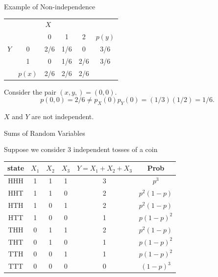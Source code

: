 \documentclass{beamer}\usepackage[]{graphicx}\usepackage[]{color}
\begin{document}
\begin{frame}[fragile]{Example of Non-independence  \;\;}

\begin{center}
\begin{tabular}{l|c||c|c|c||c|}
\multicolumn{5}{c}{$X$}\\
\cline{2-6}
&&0&1&2&$p(y)$\\
\cline{2-6}
$Y$&0&2/6& 1/6&0&3/6\\
\cline{2-6}
   &1&0&1/6&2/6&3/6\\
\cline{2-6}
   &$p(x)$ &2/6&2/6&2/6&\\
\cline{2-6}
\end{tabular}
\end{center}

Consider the pair $(x,y,) = (0,0).$
$$p(0,0) = 2/6 \ne p_X(0)p_Y(0) = (1/3)(1/2) = 1/6.$$

$X$ and $Y$ are not independent.

\end{frame}


\begin{frame}{Sums of Random Variables}

Suppose we consider 3 independent tosses of a coin 

\begin{tabular}{|c|c|c|c|c|c|}
\hline
state & $X_1$ & $X_2$ & $X_3$ & $Y=X_1 + X_2 + X_3$ & Prob\\ \hline
HHH & 1 & 1 & 1 & 3 & $p^3$ \\ \hline
HHT & 1 & 1 & 0 & 2 & $p^2 (1-p) $ \\ \hline
HTH & 1 & 0 & 1 & 2 & $p^2 (1-p) $ \\ \hline
HTT & 1 & 0 & 0 & 1 & $p (1-p)^2 $ \\ \hline
THH & 0 & 1 & 1 & 2 & $p^2 (1-p) $\\ \hline
THT & 0 & 1 & 0 & 1 & $ p (1-p)^2 $ \\ \hline
TTH & 0 & 0 & 1 & 1 & $ p (1-p)^2 $ \\ \hline
TTT & 0 & 0 & 0 & 0 & $ (1-p)^3 $ \\ \hline
\end{tabular} \pause \newline \newline
 \end{frame}
\end{document}
